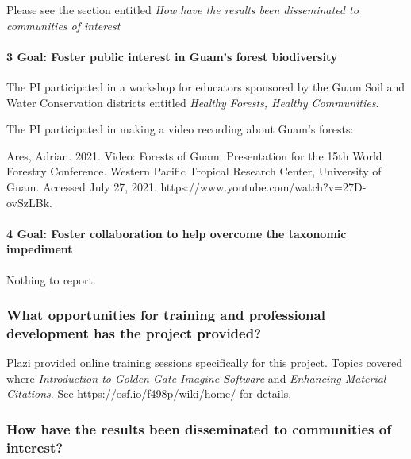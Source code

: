 \documentclass[
]{article}
\begin{document}
Please see the section entitled \emph{How have the results been
disseminated to communities of interest}

\hypertarget{goal-foster-public-interest-in-guams-forest-biodiversity-1}{%
\paragraph{3 Goal: Foster public interest in Guam's forest
biodiversity}\label{goal-foster-public-interest-in-guams-forest-biodiversity-1}}

The PI participated in a workshop for educators sponsored by the Guam
Soil and Water Conservation districts entitled \emph{Healthy Forests,
Healthy Communities}.

The PI participated in making a video recording about Guam's forests:

Ares, Adrian. 2021. Video: Forests of Guam. Presentation for the 15th
World Forestry Conference. Western Pacific Tropical Research Center,
University of Guam. Accessed July 27, 2021.
https://www.youtube.com/watch?v=27D-ovSzLBk.

\hypertarget{goal-foster-collaboration-to-help-overcome-the-taxonomic-impediment-1}{%
\paragraph{4 Goal: Foster collaboration to help overcome the taxonomic
impediment}\label{goal-foster-collaboration-to-help-overcome-the-taxonomic-impediment-1}}

Nothing to report.

\hypertarget{what-opportunities-for-training-and-professional-development-has-the-project-provided}{%
\subsubsection{What opportunities for training and professional
development has the project
provided?}\label{what-opportunities-for-training-and-professional-development-has-the-project-provided}}

Plazi provided online training sessions specifically for this project.
Topics covered where \emph{Introduction to Golden Gate Imagine Software}
and \emph{Enhancing Material Citations}. See
https://osf.io/f498p/wiki/home/ for details.

\hypertarget{how-have-the-results-been-disseminated-to-communities-of-interest}{%
\subsubsection{How have the results been disseminated to communities of
interest?}\label{how-have-the-results-been-disseminated-to-communities-of-interest}}
\end{document}
